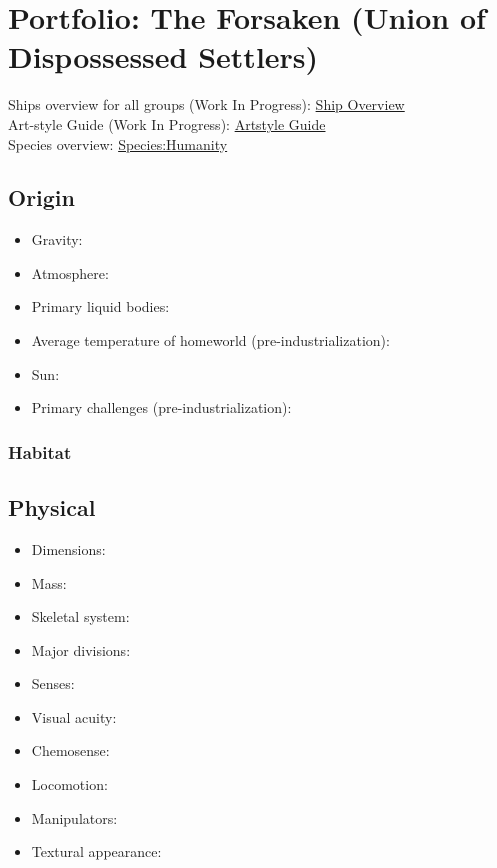 \section{Portfolio: The Forsaken (Union of Dispossessed Settlers)}
Ships overview for all groups (Work In Progress): \href{http://vegastrike.sourceforge.net/wiki/Artstyle\_guide:Overview\_Guide}{Ship Overview} \\
Art-style Guide (Work In Progress): \href{http://vegastrike.sourceforge.net/wiki/Artstyle\_guide:Forsaken}{Artstyle Guide} \\
Species overview: \href{http://vegastrike.sourceforge.net/wiki/Species:Humanity}{Species:Humanity} \\

\subsection{Origin}
\begin{itemize}
\item Gravity: 

\item Atmosphere: 

\item Primary liquid bodies: 

\item Average temperature of homeworld (pre-industrialization):

\item Sun: 

\item Primary challenges (pre-industrialization): 
\end{itemize}


\subsubsection{Habitat}

\subsection{Physical}
\begin{itemize}
\item Dimensions: 

\item Mass: 

\item Skeletal system: 

\item Major divisions: 

\item Senses: 

\item Visual acuity: 

\item Chemosense: 

\item Locomotion: 

\item Manipulators: 

\item Textural appearance: 
\end{itemize}

